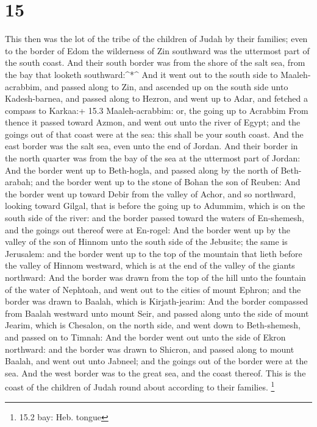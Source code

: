 \hypertarget{section-14}{%
\section{15}\label{section-14}}

 This then was the lot of the tribe of the children of Judah
by their families; even to the border of Edom the wilderness of Zin
southward was the uttermost part of the south coast.  And
their south border was from the shore of the salt sea, from the bay that
looketh southward:\^{}*\^{}  And it went out to the south
side to Maaleh-acrabbim, and passed along to Zin, and ascended up on the
south side unto Kadesh-barnea, and passed along to Hezron, and went up
to Adar, and fetched a compass to Karkaa:+ 15.3 Maaleh-acrabbim: or, the
going up to Acrabbim  From thence it passed toward Azmon,
and went out unto the river of Egypt; and the goings out of that coast
were at the sea: this shall be your south coast.  And the
east border was the salt sea, even unto the end of Jordan. And their
border in the north quarter was from the bay of the sea at the uttermost
part of Jordan:  And the border went up to Beth-hogla, and
passed along by the north of Beth-arabah; and the border went up to the
stone of Bohan the son of Reuben:  And the border went up
toward Debir from the valley of Achor, and so northward, looking toward
Gilgal, that is before the going up to Adummim, which is on the south
side of the river: and the border passed toward the waters of
En-shemesh, and the goings out thereof were at En-rogel: 
And the border went up by the valley of the son of Hinnom unto the south
side of the Jebusite; the same is Jerusalem: and the border went up to
the top of the mountain that lieth before the valley of Hinnom westward,
which is at the end of the valley of the giants northward: 
And the border was drawn from the top of the hill unto the fountain of
the water of Nephtoah, and went out to the cities of mount Ephron; and
the border was drawn to Baalah, which is Kirjath-jearim: 
And the border compassed from Baalah westward unto mount Seir, and
passed along unto the side of mount Jearim, which is Chesalon, on the
north side, and went down to Beth-shemesh, and passed on to Timnah:
 And the border went out unto the side of Ekron northward:
and the border was drawn to Shicron, and passed along to mount Baalah,
and went out unto Jabneel; and the goings out of the border were at the
sea.  And the west border was to the great sea, and the
coast thereof. This is the coast of the children of Judah round about
according to their families. \footnote{15.2 bay: Heb. tongue}

